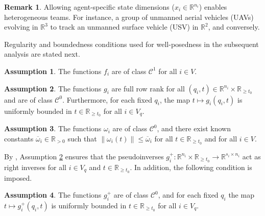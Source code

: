 \documentclass[letterpaper, 10 pt, conference]{ieeeconf}
\newcommand{\R}{\mathbb{R}}
\theoremstyle{definition}
\newtheorem{assumption}{Assumption}
\newtheorem{remark}{Remark}
\begin{document}
\begin{remark}
    Allowing agent-specific state dimensions ($x_i\in \mathbb{R}^{n_i}$) enables heterogeneous teams. For instance, a group of unmanned aerial vehicles (UAVs) evolving in $\mathbb{R}^3$ to track an unmanned surface vehicle (USV) in $\R^2$, and conversely. 
\end{remark}

Regularity and boundedness conditions used for well-posedness in the subsequent analysis are stated next.
\begin{assumption}
\label{functionbound}The functions $f_{i}$ are of class $\mathcal{C}^{1}$
for all $i\in V$.
\end{assumption}

\begin{assumption}
\label{control effectiveness}The functions $g_{i}$ are full row rank for all $(q_i,t)\in\mathbb{R}^{n_{i}}\times\mathbb{R}_{\geq{t_0}}$ and are of class $\mathcal{C}^{0}$. Furthermore, for each fixed $q_{i}$, the map $t\mapsto g_{i}(q_{i},t)$ is uniformly bounded in $t\in \mathbb{R}_{\geq{t_0}}$ for all $i\in V_q$.
\end{assumption}

\begin{assumption}
\label{disturbance bound}The functions $\omega_{i}$ are of class $\mathcal{C}^{0}$, and there exist known constants $\overline{\omega}_{i}\in\mathbb{R}_{>0}$ such that $\| \omega_{i}\left(t\right)\| \leq\overline{\omega}_{i}$ for all $t\in\mathbb{R}_{\geq t_{0}}$ and for all $i\in V$.
\end{assumption}

By \cite{Penrose.R1955}, Assumption \ref{control effectiveness} ensures that the pseudoinverses $g_{i}^{+}:\mathbb{R}^{n_i}\times\mathbb{R}_{\geq t_{0}}\to\mathbb{R}^{s_{i}\times n_i}$ act as right inverses for all $i\in V_q$ and $t\in\mathbb{R}_{\geq t_{0}}$. In addition, the following condition is imposed.
\begin{assumption}
\label{gInvBound}The functions $g_{i}^{+}$ are of class $\mathcal{C}^{0}$, and for each fixed $q_{i}$ the map $t\mapsto g_{i}^{+}(q_{i},t)$ is uniformly bounded in $t\in \mathbb{R}_{\geq{t_0}}$ for all $i\in V_q$.
\end{assumption}
\end{document}
